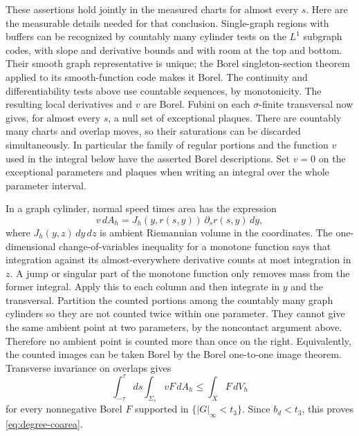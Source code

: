 These assertions hold jointly in the measured charts for almost every
$s$.  Here are the measurable details needed for that conclusion.
Single-graph regions with buffers can be recognized by countably many
cylinder tests on the $L^1$ subgraph codes, with slope and derivative
bounds and with room at the top and bottom.  Their smooth graph
representative is unique; the Borel singleton-section theorem applied to
its smooth-function code makes it Borel.  The continuity and
differentiability tests above use countable sequences, by monotonicity.
The resulting local derivatives and $v$ are Borel.  Fubini on each
$\sigma$-finite transversal now gives, for almost every $s$, a null set
of exceptional plaques.  There are countably many charts and overlap
moves, so their saturations can be discarded simultaneously.  In
particular the family of regular portions and the function $v$ used in
the integral below have the asserted Borel descriptions.
Set $v=0$ on the exceptional parameters and plaques when writing an
integral over the whole parameter interval.

In a graph cylinder, normal speed times area has the expression
\[
                v\,dA_h=J_h(y,r(s,y))\,\partial_s r(s,y)\,dy,
\]
where $J_h(y,z)\,dy\,dz$ is ambient Riemannian volume in the coordinates.
The one-dimensional change-of-variables inequality for a monotone
function says that integration against its almost-everywhere derivative
counts at most integration in $z$.  A jump or singular part of the
monotone function only removes mass from the former integral.  Apply this
to each column and then integrate in $y$ and the transversal.  Partition
the counted portions among the countably many graph cylinders so they
are not counted twice within one parameter.  They cannot give the same
ambient point at two parameters, by the noncontact argument above.
Therefore no ambient point is counted more than once on the right.
Equivalently, the counted images can be taken Borel by the Borel
one-to-one image theorem.  Transverse invariance on overlaps gives
\begin{equation}\label{eq:degree-coarea-proof}
          \int_{-\tau}^{\tau}\!ds\int_{\Sigma_s}vF\,dA_h
                               \le\int_XF\,dV_h
\end{equation}
for every nonnegative Borel $F$ supported in $\{|G|_\infty<t_3\}$.
Since $b_d<t_3$, this proves \eqref{eq:degree-coarea}.

